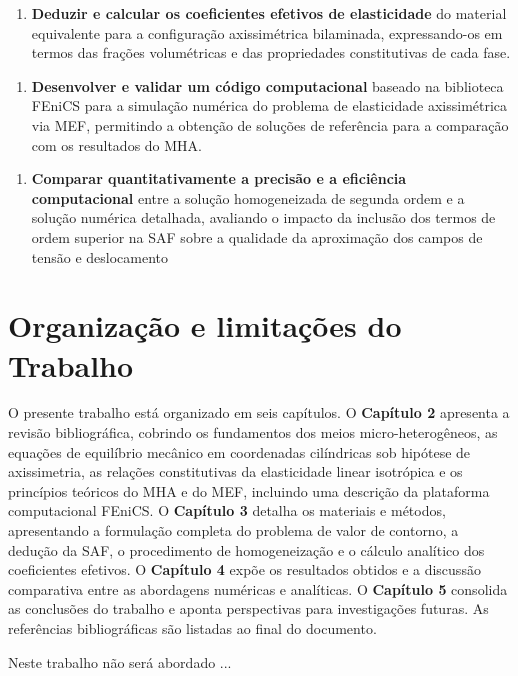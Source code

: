 \begin{enumerate}
  \item \textbf{Deduzir e calcular os coeficientes efetivos de elasticidade} do
  material equivalente para a configuração axissimétrica bilaminada,
  expressando-os em termos das frações volumétricas e das propriedades
  constitutivas de cada fase. %
\end{enumerate}

\begin{enumerate}
  \item \textbf{Desenvolver e validar um código computacional} baseado na biblioteca
  FEniCS para a simulação numérica do problema de elasticidade
  axissimétrica via MEF, permitindo a obtenção de soluções de referência
  para a comparação com os resultados do MHA.
\end{enumerate}

\begin{enumerate}
  \item \textbf{Comparar quantitativamente a precisão e a eficiência computacional}
  entre a solução homogeneizada de segunda ordem e a solução numérica
  detalhada, avaliando o impacto da inclusão dos termos de ordem superior
  na SAF sobre a qualidade da aproximação dos campos de tensão e
  deslocamento %
\end{enumerate}


\section{Organização e limitações do Trabalho}

O presente trabalho está organizado em seis capítulos. O \textbf{Capítulo 2}
apresenta a revisão bibliográfica, cobrindo os fundamentos dos meios
micro-heterogêneos, as equações de equilíbrio mecânico em coordenadas
cilíndricas sob hipótese de axissimetria, as relações constitutivas da
elasticidade linear isotrópica e os princípios teóricos do MHA e do MEF,
incluindo uma descrição da plataforma computacional FEniCS. O \textbf{Capítulo 3}
detalha os materiais e métodos, apresentando a formulação completa do
problema de valor de contorno, a dedução da SAF, o procedimento de
homogeneização e o cálculo analítico dos coeficientes efetivos. O
\textbf{Capítulo 4} expõe os resultados obtidos e a discussão comparativa entre
as abordagens numéricas e analíticas. O \textbf{Capítulo 5} consolida as
conclusões do trabalho e aponta perspectivas para investigações futuras.
As referências bibliográficas são listadas ao final do documento.

Neste trabalho não será abordado ...

